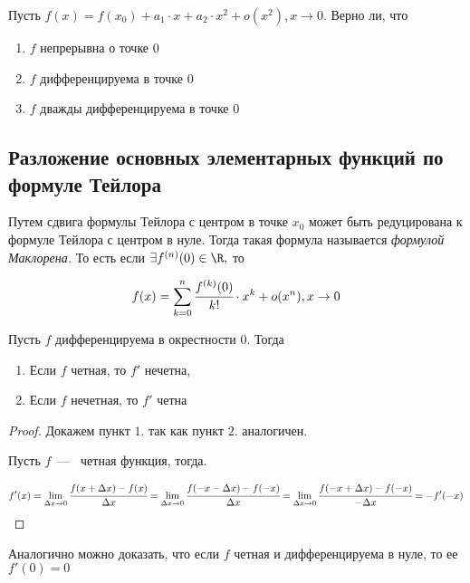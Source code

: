 \begin{problem}
	Пусть $f(x) = f(x_{0}) + a_{1}\cdot x + a_{2}\cdot x^{2} + o(x^{2}), x \to 0.$ Верно ли, что \begin{enumerate}
		\item $f$ непрерывна о точке $0$
		\item $f$ дифференцируема в точке $0$
		\item $f$ дважды дифференцируема в точке $0$
	\end{enumerate}
\end{problem}

\subsection{Разложение основных элементарных функций по формуле Тейлора}
\begin{definition}
	Путем сдвига формулы Тейлора с центром в точке $x_{0}$ может быть редуцирована к формуле Тейлора с центром в нуле. Тогда такая формула называется \textit{формулой Маклорена.}  То есть если $\exists f^{(n) }(0) \in \R,$ то 
	
	$$f(x) = \sum\limits_{k = 0}^{n} \cfrac{f^{(k)}(0)}{k!} \cdot x^{k} + o(x^{n}), x \to 0$$
\end{definition}

\begin{lemma}
	Пусть $f$ дифференцируема в окрестности 0. Тогда
	\begin{enumerate}
		\item Если $f$ четная, то $f'$ нечетна,
		\item Если $f$ нечетная, то $f'$ четна
	\end{enumerate}
\end{lemma}
\begin{proof}
	Докажем пункт $1.$ так как пункт $2.$ аналогичен.
	
	Пусть $f$~---~ четная функция, тогда.
	
	$$f'(x) = \lim\limits_{\Delta x\to 0} \cfrac{f(x+\Delta x) - f(x)}{\Delta x} = \lim\limits_{\Delta x \to 0} \cfrac{f(-x-\Delta x) - f(-x)}{\Delta x} =\lim\limits_{\Delta x \to 0} \cfrac{f(-x +\Delta x) - f(-x)}{-\Delta x} = -f'(-x)$$
\end{proof}

\begin{note}
	Аналогично можно доказать, что если $f$ четная и дифференцируема в нуле, то ее $f'(0) = 0$
\end{note}

